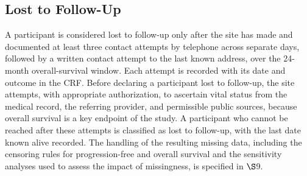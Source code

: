 \subsection{Lost to Follow-Up}

A participant is considered lost to follow-up only after the site has made and
documented at least three contact attempts by telephone across separate days,
followed by a written contact attempt to the last known address, over the 24-month
overall-survival window. Each attempt is recorded with its date and outcome in the
CRF. Before declaring a participant lost to follow-up, the site attempts, with
appropriate authorization, to ascertain vital status from the medical record, the
referring provider, and permissible public sources, because overall survival is a
key endpoint of the study. A participant who cannot be reached after these attempts
is classified as lost to follow-up, with the last date known alive recorded. The
handling of the resulting missing data, including the censoring rules for
progression-free and overall survival and the sensitivity analyses used to assess
the impact of missingness, is specified in $\S$9.
